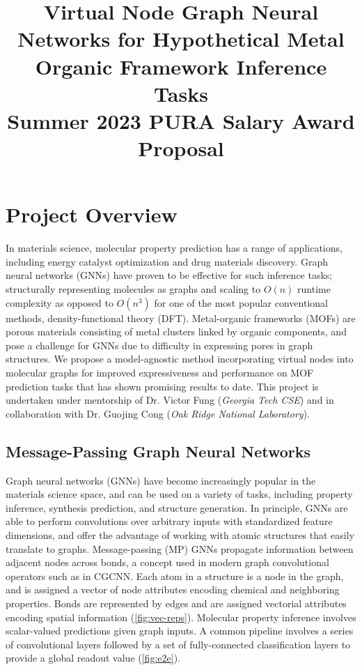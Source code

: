 \documentclass{lxaiproposal}
\title{Virtual Node Graph Neural Networks for Hypothetical Metal Organic Framework Inference Tasks\\ \large Summer 2023 PURA Salary Award Proposal}
\author{\coord{Sidharth Baskaran}{}{1}}
\begin{document}
\maketitle

\section*{Project Overview}

In materials science, molecular property prediction has a range of applications, including
energy catalyst optimization and drug materials discovery. Graph neural networks (GNNs) have proven to be effective for such inference tasks; structurally representing molecules as graphs and scaling to $O(n)$ runtime complexity as opposed to $O(n^3)$ for one of the most popular conventional methods, density-functional theory (DFT). Metal-organic frameworks (MOFs) are porous materials consisting of metal clusters linked by organic components, and pose a challenge for GNNs due to difficulty in expressing pores in graph structures. We propose a model-agnostic method incorporating virtual nodes into molecular graphs for improved expressiveness and performance on MOF prediction tasks that has shown promising results to date.
This project is undertaken under mentorship of Dr. Victor Fung (\textit{Georgia Tech CSE}) and in collaboration with Dr. Guojing Cong (\textit{Oak Ridge National Laboratory}).

\subsection*{Message-Passing Graph Neural Networks}

Graph neural networks (GNNs) have become increasingly popular in the materials science space, and can be used on a variety of tasks, including property inference, synthesis prediction, and structure generation\cite{Reiser2022}. In principle, GNNs are able to perform convolutions over arbitrary inputs with standardized feature dimensions, and offer the advantage of working with atomic structures that easily translate to graphs. Message-passing (MP) GNNs propagate information between adjacent nodes across bonds, a concept used in modern graph convolutional operators such as in CGCNN\cite{Xie_2018}. Each atom in a structure is a node in the graph, and is assigned a vector of node attributes encoding chemical and neighboring properties. Bonds are represented by edges and are assigned vectorial attributes encoding spatial information (\ref{fig:vec-reps}). Molecular property inference involves scalar-valued predictions given graph inputs. A common pipeline involves a series of convolutional layers followed by a set of fully-connected classification layers to provide a global readout value (\ref{fig:e2e}).
\end{document}
